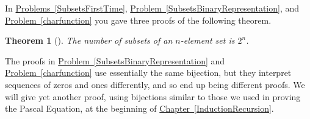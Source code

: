 \documentclass[10pt,]{book}
\theoremstyle{plain}
\newtheorem{theorem}{Theorem}[section]
\theoremstyle{definition}
\theoremstyle{definition}
\numberwithin{equation}{chapter}
\begin{document}
\hypertarget{p-198}{}%
In \hyperref[SubsetsFirstTime]{Problems~\ref{SubsetsFirstTime}}, \hyperref[SubsetsBinaryRepresentation]{Problem~\ref{SubsetsBinaryRepresentation}}, and \hyperref[charfunction]{Problem~\ref{charfunction}} you gave three proofs of the following theorem.%
\begin{theorem}[{}]\label{theorem-1}
\hypertarget{p-199}{}%
The number of subsets of an \(n\)-element set is \(2^n\).%
\end{theorem}
\hypertarget{p-200}{}%
The proofs in \hyperref[SubsetsBinaryRepresentation]{Problem~\ref{SubsetsBinaryRepresentation}} and \hyperref[charfunction]{Problem~\ref{charfunction}} use essentially the same bijection, but they interpret sequences of zeros and ones differently, and so end up being different proofs. We will give yet another proof, using bijections similar to those we used in proving the Pascal Equation, at the beginning of \hyperref[InductionRecursion]{Chapter~\ref{InductionRecursion}}.%
\typeout{************************************************}
\typeout{************************************************}
\end{document}
